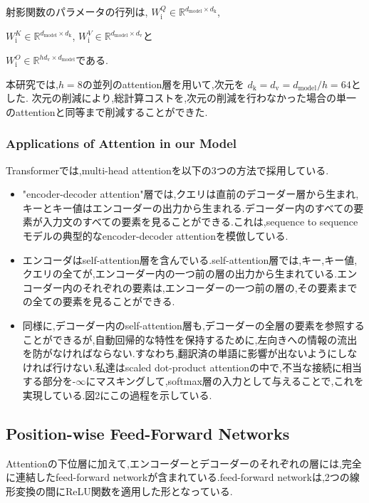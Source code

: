 \documentclass[twocolumn]{jarticle}     %
\begin{document}
射影関数のパラメータの行列は,
$W_\mathrm{i}^Q \in \mathbb{R} ^ {{d_\mathrm{model}} \times {d_\mathrm{k}}}$,\par
$W_\mathrm{i}^K \in \mathbb{R} ^ {{d_\mathrm{model}} \times {d_\mathrm{k}}}$,
$W_\mathrm{i}^V \in \mathbb{R} ^ {{d_\mathrm{model}} \times {d_\mathrm{v}}}$と\par
$W_\mathrm{i}^O \in \mathbb{R} ^ {{hd_\mathrm{v}} \times {d_\mathrm{model}}}$である.

本研究では,$h=8$の並列のattention層を用いて,次元を
$d_\mathrm{k} = d_\mathrm{v} = d_\mathrm{model}/h = 64$とした.
次元の削減により,総計算コストを,次元の削減を行わなかった場合の単一のattentionと同等まで削減することができた.

\subsubsection{Applications of Attention in our Model}
Transformerでは,multi-head attentionを以下の3つの方法で採用している.
\begin{itemize}
  \item "encoder-decoder attention"層では,クエリは直前のデコーダー層から生まれ,キーとキー値はエンコーダーの出力から生まれる.デコーダー内のすべての要素が入力文のすべての要素を見ることができる.これは,sequence to sequenceモデルの典型的なencoder-decoder attentionを模倣している.
  \item エンコーダはself-attention層を含んでいる.self-attention層では,キー,キー値,クエリの全てが,エンコーダー内の一つ前の層の出力から生まれている.エンコーダー内のそれぞれの要素は,エンコーダーの一つ前の層の,その要素までの全ての要素を見ることができる.
  \item 同様に,デコーダー内のself-attention層も,デコーダーの全層の要素を参照することができるが,自動回帰的な特性を保持するために,左向きへの情報の流出を防がなければならない.すなわち,翻訳済の単語に影響が出ないようにしなければ行けない.私達はscaled dot-product attentionの中で,不当な接続に相当する部分を-$\infty$にマスキングして,softmax層の入力として与えることで,これを実現している.図2にこの過程を示している.
\end{itemize}

\subsection{Position-wise Feed-Forward Networks}
Attentionの下位層に加えて,エンコーダーとデコーダーのそれぞれの層には,完全に連結したfeed-forward networkが含まれている.feed-forward networkは,2つの線形変換の間にReLU関数を適用した形となっている.
\end{document}
